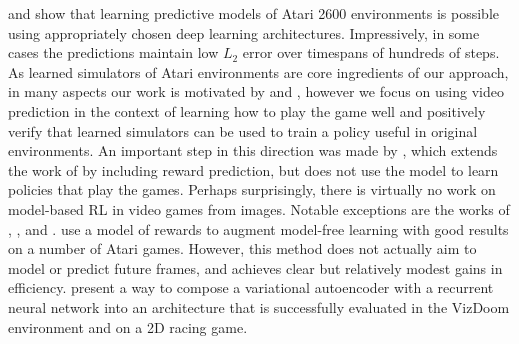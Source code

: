 \citet{video_prediction} and \citet{recurrent} show that learning predictive models of Atari 2600 environments is possible using appropriately chosen deep learning architectures. Impressively, in some cases the predictions maintain low $L_2$ error over timespans of hundreds of steps. 
As learned simulators of Atari environments are core ingredients of our approach, in many aspects our work is motivated by \citet{video_prediction} and \citet{recurrent}, however we focus on using video prediction in the context of learning how to play the game well and positively verify that learned simulators can be used to train a policy useful in original environments.
An important step in this direction was made by \citet{video_reward_prediction}, which extends the work of \citet{video_prediction} by including reward prediction, but does not use the model to learn policies that play the games.
Perhaps surprisingly, there is virtually no work on model-based RL in video games from images.
Notable exceptions are the works of
\citet{vpn}, \citet{world_models}, \citet{dyna_dqn} and \cite{gats}. \citet{vpn} use a model of rewards to augment model-free learning with good results on a number of Atari games. However, this method does not actually aim to model or predict future frames, and achieves clear but relatively modest gains in efficiency.
\citet{world_models} present a way to compose a variational autoencoder with a recurrent neural network into an architecture  
that is successfully evaluated in the VizDoom environment and on a 2D racing game. 
